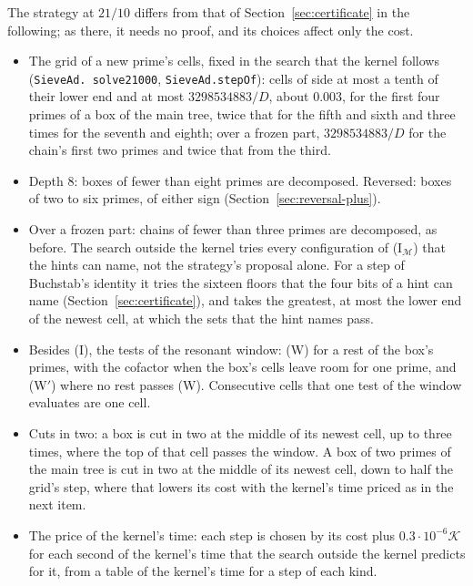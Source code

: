\documentclass[11pt]{article}
\theoremstyle{definition}
\newcommand{\lean}[1]{\texttt{#1}}
\begin{document}
The strategy at $21/10$ differs from that of Section~\ref{sec:certificate} in the following; as there, it needs no
proof, and its choices affect only the cost.
\begin{itemize}
\item The grid of a new prime's cells, fixed in the search that the kernel follows (\lean{SieveAd.\allowbreak
  solve21000}, \lean{SieveAd.\allowbreak stepOf}): cells of side at most a tenth of their lower end and at most
  $3298534883/D$, about $0.003$, for the first four primes of a box of the main tree, twice that for the fifth and
  sixth and three times for the seventh and eighth; over a frozen part, $3298534883/D$ for the chain's first two primes
  and twice that from the third.
\item Depth $8$: boxes of fewer than eight primes are decomposed. Reversed: boxes of two to six primes, of either sign
  (Section~\ref{sec:reversal-plus}).
\item Over a frozen part: chains of fewer than three primes are decomposed, as before. The search outside the kernel
  tries every configuration of (I$_{\mathcal M}$) that the hints can name, not the strategy's proposal alone. For a
  step of Buchstab's identity it tries the sixteen floors that the four bits of a hint can name
  (Section~\ref{sec:certificate}), and takes the greatest, at most the lower end of the newest cell, at which the sets
  that the hint names pass.
\item Besides (I), the tests of the resonant window: (W) for a rest of the box's primes, with the cofactor when the
  box's cells leave room for one prime, and (W$'$) where no rest passes (W). Consecutive cells that one test of the
  window evaluates are one cell.
\item Cuts in two: a box is cut in two at the middle of its newest cell, up to three times, where the top of that cell
  passes the window. A box of two primes of the main tree is cut in two at the middle of its newest cell, down to half
  the grid's step, where that lowers its cost with the kernel's time priced as in the next item.
\item The price of the kernel's time: each step is chosen by its cost plus $0.3 \cdot 10^{-6}\mathcal K$ for each
  second of the kernel's time that the search outside the kernel predicts for it, from a table of the kernel's time
  for a step of each kind.
\end{itemize}
\end{document}
